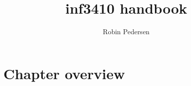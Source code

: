 \documentclass{article}
\begin{document}
  \title{inf3410 handbook}
  \author{Robin Pedersen}
  \maketitle

  \section{Chapter overview}
    
\end{document}
